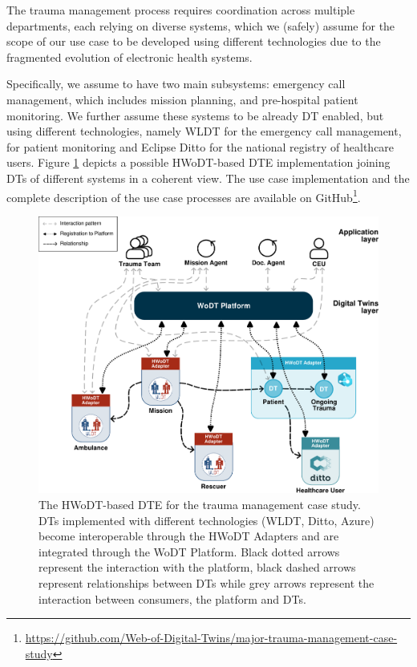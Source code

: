 The trauma management process requires coordination across multiple departments, each relying on diverse systems, which we (safely) assume for the scope of our use case to be developed using different technologies due to the fragmented evolution of electronic health systems.

Specifically, we assume to have two main subsystems: emergency call management, which includes mission planning, and pre-hospital patient monitoring.
%
We further assume these systems to be already \ac{DT} enabled, but using different technologies, namely \ac{WLDT} for the emergency call management, \azureTwin{} for patient monitoring and Eclipse Ditto for the national registry of healthcare users.
%
Figure \ref{fig:use-case-diagram} depicts a possible \ac{HWoDT}-based \ac{DTE} implementation joining \acp{DT} of different systems in a coherent view.
%
The use case implementation and the complete description of the use case processes are available on GitHub\footnote{\url{https://github.com/Web-of-Digital-Twins/major-trauma-management-case-study}}.


\begin{figure}[ht]
  \centering
  \includegraphics[width=\columnwidth]{figures/hwodt/major-trauma-management.pdf}
  \caption{The \ac{HWoDT}-based \ac{DTE} for the trauma management case study. \acp{DT} implemented with different technologies (WLDT, Ditto, Azure) become interoperable through the HWoDT Adapters and are integrated through the WoDT Platform. 
  Black dotted arrows represent the interaction with the platform, black dashed arrows represent relationships between \acp{DT} while grey arrows represent the interaction between consumers, the platform and \acp{DT}.
  }
  \label{fig:use-case-diagram}
\end{figure}


